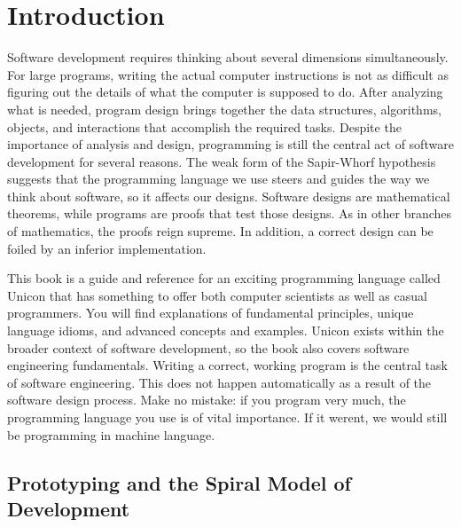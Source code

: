 \section{Introduction}

Software development requires thinking about several
dimensions simultaneously. For large programs, writing the actual
computer instructions is not as difficult as figuring out the
details of what the computer is supposed to do. After analyzing what is
needed, program design brings together the data structures, algorithms,
objects, and interactions that accomplish the required tasks. Despite
the importance of analysis and design, programming is still the central
act of software development for several reasons. The weak form of the
Sapir-Whorf hypothesis suggests that the programming
language we use steers and guides the way we think about software, so
it affects our designs. Software designs are mathematical theorems,
while programs are proofs that test those designs. As in other
branches of mathematics, the proofs reign supreme. In addition, a
correct design can be foiled by an inferior implementation.

This book is a guide and reference for an exciting
programming language called Unicon that has something to offer both
computer scientists as well as casual programmers. You
will find explanations of fundamental principles, unique language
idioms, and advanced concepts and examples. Unicon exists within the
broader context of software development, so the book also covers
software engineering fundamentals. Writing a correct, working
program is the central task of software engineering. This does not
happen automatically as a result of the software design process. Make
no mistake: if you program very much, the programming language you use
is of vital importance. If it weren{\textquotesingle}t, we would still
be programming in machine language.

\subsection{Prototyping and the Spiral Model of Development}

